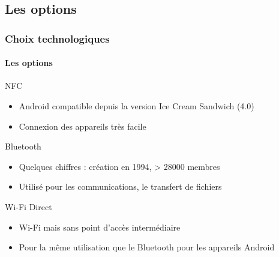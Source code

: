 \documentclass{beamer}
\begin{document}
    \subsection{Les options}
    \begin{frame}
      \frametitle{Choix technologiques}
      \framesubtitle{Les options}
      \begin{small}
        \begin{block}{NFC}
          \begin{itemize}
            \item Android compatible depuis la version Ice Cream Sandwich (4.0)
            \item Connexion des appareils très facile
          \end{itemize}
        \end{block}
        \begin{block}{Bluetooth}
          \begin{itemize}
            \item Quelques chiffres : création en 1994, > 28000 membres
            \item Utilisé pour les communications, le transfert de fichiers
          \end{itemize}
        \end{block}
        \begin{block}{Wi-Fi Direct}
          \begin{itemize}
            \item Wi-Fi mais sans point d'accès intermédiaire
            \item Pour la même utilisation que le Bluetooth pour les appareils Android
          \end{itemize}
        \end{block}
      \end{small}
    \end{frame}
\end{document}
